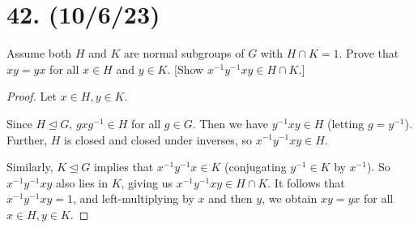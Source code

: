 \documentclass{article}
\begin{document}
\section*{42. (10/6/23)}

Assume both $H$ and $K$ are normal subgroups of $G$ with $H \cap K = 1$. Prove that $xy = yx$ for all $x \in H$ and $y \in K$. [Show $x^{-1}y^{-1}xy \in H \cap K$.]

\begin{proof}
    Let $x \in H, y \in K$.
    
    Since $H \unlhd G$, $gxg^{-1} \in H$ for all $g \in G$. Then we have $y^{-1}xy \in H$ (letting $g = y^{-1}$). Further, $H$ is closed and closed under inverses, so $x^{-1}y^{-1}xy \in H$.

    Similarly, $K \unlhd G$ implies that $x^{-1}y^{-1}x \in K$ (conjugating $y^{-1} \in K$ by $x^{-1}$). So $x^{-1}y^{-1}xy$ also lies in $K$, giving us $x^{-1}y^{-1}xy \in H \cap K$. It follows that $x^{-1}y^{-1}xy = 1$, and left-multiplying by $x$ and then $y$, we obtain $xy = yx$ for all $x \in H, y \in K$.
\end{proof}
\end{document}
